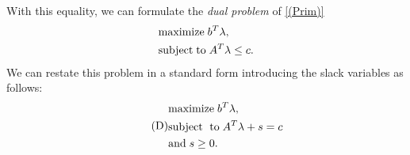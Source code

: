 \documentclass[a4paper,10 pt,titlepage,twoside]{book}
\theoremstyle{plain}
\theoremstyle{definition}
\theoremstyle{remark}
\begin{document}
With this equality, we can formulate the \textit{dual problem} of \ref{(Prim)}
\begin{equation}\label{Dual}
\begin{split}
&\text{maximize\;} b^{T}\lambda,\\
&\text{subject\;to\;}A^{T}\lambda \leq c.
\end{split}
\end{equation} 
We can restate this problem in a standard form introducing the slack variables as follows:
\begin{equation}\tag{D}\label{(Dual)}
\begin{split}
&\text{maximize\;}b^{T}\lambda,\\
&\text{subject\; to\;}A^{T}\lambda+s=c\\ &\text{and\;} s\geq0.
\end{split}
\end{equation}
\end{document}
